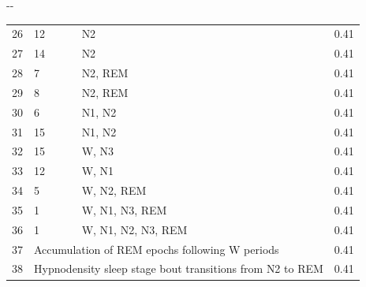 \begin{table}[h]
\begin{adjustwidth*}{}{-\marginparwidth-\marginparsep}
\begin{tabular}{@{}lp{4.5cm}lr@{}}
        26 & 12                                                     & \ac{N2}                               & 0.41                         \\
        27 & 14                                                     & \ac{N2}                               & 0.41                         \\
        28 & 7                                                      & \ac{N2}, \ac{REM}                     & 0.41                         \\
        29 & 8                                                      & \ac{N2}, \ac{REM}                     & 0.41                         \\
        30 & 6                                                      & \ac{N1}, \ac{N2}                      & 0.41                         \\
        31 & 15                                                     & \ac{N1}, \ac{N2}                      & 0.41                         \\
        32 & 15                                                     & \ac{W}, \ac{N3}                       & 0.41                         \\
        33 & 12                                                     & \ac{W}, \ac{N1}                       & 0.41                         \\
        34 & 5                                                      & \ac{W}, \ac{N2}, \ac{REM}             & 0.41                         \\
        35 & 1                                                      & \ac{W}, \ac{N1}, \ac{N3}, \ac{REM}    & 0.41                         \\
        36 & 1                                                      & \ac{W}, \ac{N1}, \ac{N2}, \ac{N3}, \ac{REM}   & 0.41                 \\
        37 & \multicolumn{2}{l}{Accumulation of \ac{REM} epochs following \ac{W} periods}                   & 0.41                         \\
        38 & \multicolumn{2}{l}{Hypnodensity sleep stage bout transitions from \ac{N2} to \ac{REM}}         & 0.41                         \\ \bottomrule
    \end{tabular}
    \end{adjustwidth*}
\end{table}

